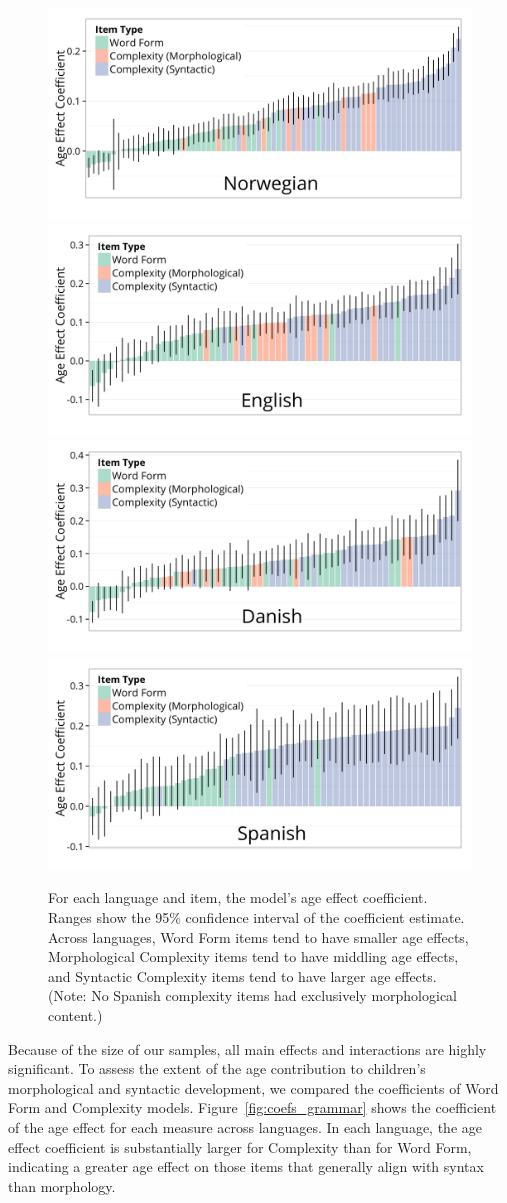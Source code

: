 \documentclass[10pt,letterpaper]{article}
\begin{document}
\begin{figure}
\centering
\includegraphics[width=.45\textwidth]{plots/item_coef_plot_norwegian-1.png}
\includegraphics[width=.45\textwidth]{plots/item_coef_plot_english-1.png}\\
\includegraphics[width=.45\textwidth]{plots/item_coef_plot_danish-1.png}
\includegraphics[width=.45\textwidth]{plots/item_coef_plot_spanish-1.png}
\caption{\label{fig:interactions} For each language and item, the model's age effect coefficient. Ranges show the 95\% confidence interval of the coefficient estimate. Across languages, Word Form items tend to have smaller age effects, Morphological Complexity items tend to have middling age effects, and Syntactic Complexity items tend to have larger age effects. (Note: No Spanish complexity items had exclusively morphological content.)}
\end{figure}

Because of the size of our samples, all main effects and interactions are highly significant. To assess the extent of the age contribution to children's morphological and syntactic development, we compared the coefficients of Word Form and Complexity models. Figure~\ref{fig:coefs_grammar} shows the coefficient of the age effect for each measure across languages. In each language, the age effect coefficient is substantially larger for Complexity than for Word Form, indicating a greater age effect on those items that generally align with syntax than morphology.
\end{document}
